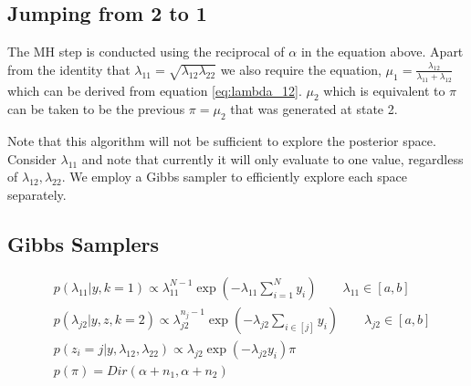\documentclass{article}
\begin{document}
\subsection{Jumping from 2 to 1}
The MH step is conducted using the reciprocal of $\alpha$ in the equation above. Apart from the identity that $\lambda_{11}=\sqrt{\lambda_{12}\lambda_{22}}$ we also require the equation, $\mu_1=\frac{\lambda_{12}}{\lambda_{11}+\lambda_{12}}$ which can be derived from equation \ref{eq:lambda_12}. $\mu_2$ which is equivalent to $\pi$ can be taken to be the previous $\pi=\mu_2$ that was generated at state 2.

Note that this algorithm will not be sufficient to explore the posterior space. Consider $\lambda_{11}$ and note that currently it will only evaluate to one value, regardless of $\lambda_{12}, \lambda_{22}$. We employ a Gibbs sampler to efficiently explore each space separately.

\subsection{Gibbs Samplers}
\begin{align}
& p(\lambda_{11}|y,k=1) \propto \lambda_{11}^{N-1}\exp(-\lambda_{11}\sum_{i=1}^{N}y_i)\qquad \lambda_{11}\in[a,b]\\
& p(\lambda_{j2}|y,z,k=2) \propto \lambda_{j2}^{n_j-1}\exp(-\lambda_{j2}\sum_{i\in[j]}y_i)\qquad \lambda_{j2}\in[a,b]\\
& p(z_i=j|y,\lambda_{12},\lambda_{22}) \propto \lambda_{j2}\exp(-\lambda_{j2}y_i)\pi\\
& p(\pi) = Dir(\alpha+n_1,\alpha+n_2)
\end{align}
\end{document}
